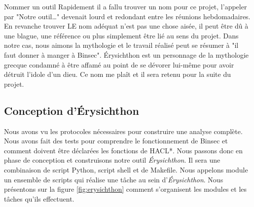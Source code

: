 \begin{CitationBox}{Nommer un outil}
    Rapidement il a fallu trouver un nom pour ce projet, l'appeler par "Notre outil\dots" devenait lourd et redondant entre les réunions hebdomadaires. En revanche trouver LE nom adéquat n'est pas une chose aisée, il peut être dû à une blague, une référence ou plus simplement être lié au sens du projet. Dans notre cas, nous aimons la mythologie et le travail réalisé peut se résumer à "il faut donner à manger à Binsec".\smallbreak
    Érysichthon est un personnage de la mythologie grecque condamné à être affamé au point de se dévorer lui-même pour avoir détruit l'idole d'un dieu. Ce nom me plaît et il sera retenu pour la suite du projet. 
\end{CitationBox}

\subsection*{Conception d'Érysichthon}


Nous avons vu les protocoles nécessaires pour construire une analyse complète. Nous avons fait des tests pour comprendre le fonctionnement de Binsec et comment doivent être déclarées les fonctions de HACL*. Nous passons donc en phase de conception et construisons notre outil \textit{Érysichthon}. Il sera une combinaison de script Python, script shell et de Makefile. Nous appelons module un ensemble de scripts qui réalise une tâche au sein d'\textit{Érysichthon}. Nous présentons sur la figure \ref{fig:erysichthon} comment s'organisent les modules et les tâches qu'ils effectuent.

